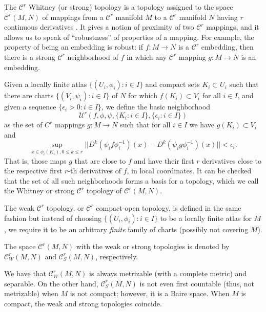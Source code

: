 \documentclass[12pt]{article}
\newcommand{\C}{\mathcal{C}}
\begin{document}
The $\C^r$ Whitney (or strong) topology is a topology
assigned to the space $\C^r(M,N)$ of mappings from
a $\C^r$ manifold $M$ to a $\C^r$ manifold $N$ having
$r$ continuous derivatives . It gives a notion of proximity
of two $\C^r$ mappings, and it allows us to speak of ``robustness''
of properties of a mapping. For example, the
property of being an embedding is robust: if $f\colon M\to N$
is a $\C^r$ embedding, then there is a strong $\C^r$
neighborhood of $f$ in which any $\C^r$ mapping $g\colon M\to N$
is an embedding.

Given a locally finite atlas $\{(U_i, \phi_i):i\in I\}$ and compact sets
$K_i\subset U_i$ such that there are charts
$\{(V_i,\psi_i) : i\in I\}$ of $N$ for which
$f(K_i)\subset V_i$ for all $i\in I$, and given a sequence
$\{\epsilon_i>0 : i\in I\}$, we define the basic neighborhood
$$\mathcal{U}^r\left(f,\phi,\psi,\{K_i:i\in I\},\{\epsilon_i:i\in I\}\right)$$
as the set of $C^r$ mappings $g\colon M\to N$ such that for all $i\in I$
we have $g(K_i)\subset V_i$ and
$$\sup_{x\in \phi_i(K_i), 0\leq k\leq r} 
||D^k(\psi_if\phi_i^{-1})(x) - D^k(\psi_ig\phi_i^{-1})(x)|| <\epsilon_i.$$
That is, those maps $g$ that are close to $f$ and have their first $r$
derivatives close to the respective first $r$-th
derivatives of $f$, in local coordinates.
It can be checked that the set of all such neighborhoods forms a basis
for a topology, which we call the Whitney or strong $\C^r$ 
topology of $\C^r(M,N)$.

The weak $\C^r$ topology, or $\C^r$ compact-open topology, is defined
in the same fashion but instead of choosing
$\{(U_i,\phi_i):i\in I\}$ to be a locally finite atlas for $M$,
we require it to be an arbitrary \emph{finite} family of charts
(possibly not covering $M$).

The space $\C^r(M,N)$ with the weak or strong topologies is denoted by
$\C^r_W(M,N)$ and $\C^r_S(M,N)$, respectively.

We have that $\C^r_W(M,N)$ is always metrizable (with a complete metric)
and separable. On the other hand, $\C^r_S(M,N)$ is not even first countable (thus, not metrizable) when $M$ is not compact; however, it is a Baire space. When $M$ is compact, the weak and strong topologies coincide.
\end{document}
